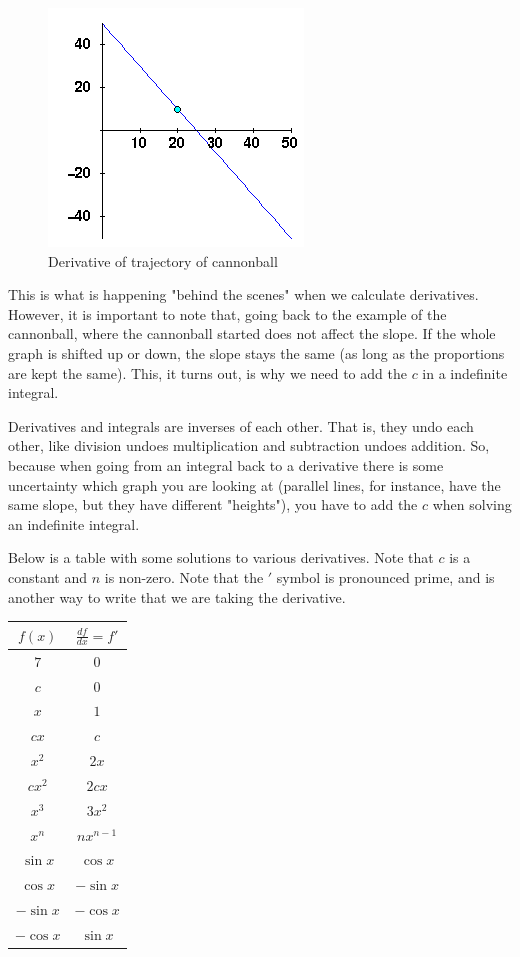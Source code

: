 \begin{figure}[H]
\caption{Derivative of trajectory of cannonball}
\includegraphics[scale=0.8]{../derivative.png}
\end{figure}

This is what is happening "behind the scenes" when we calculate derivatives.
However, it is important to note that, going back to the example of the cannonball, where the cannonball started does not affect the slope. 
If the whole graph is shifted up or down, the slope stays the same (as long as the proportions are kept the same). 
This, it turns out, is why we need to add the $c$ in a indefinite integral. 

Derivatives and integrals are inverses of each other. 
That is, they undo each other, like division undoes multiplication and subtraction undoes addition. 
So, because when going from an integral back to a derivative there is some uncertainty which graph you are looking at (parallel lines, for instance, have the same slope, but they have different "heights"), you have to add the $c$ when solving an indefinite integral.

Below is a table with some solutions to various derivatives. Note that $c$ is a constant and $n$ is non-zero. Note that the $'$ symbol is pronounced prime, and is another way to write that we are taking the derivative. 


\begin{tabular}{c|c}
    $f(x)$ & $\frac{df}{dx} = f'$\\
    \hline
       $7$  & $0$ \\
        $c$ & $0$ \\
        $x$ & $1$ \\
        $cx$ & $c$ \\
        $x^2$ & $2x$ \\
        $cx^2$ & $2cx$ \\
        $x^3$ & $3x^2$ \\
        $x^n$ & $nx^{n-1}$ \\
        $\sin x$ & $\cos x$ \\
        $\cos x$ & $-\sin x$ \\
        $- \sin x$ & $- \cos x$ \\
        $-\cos x$ & $\sin x$
\end{tabular}

